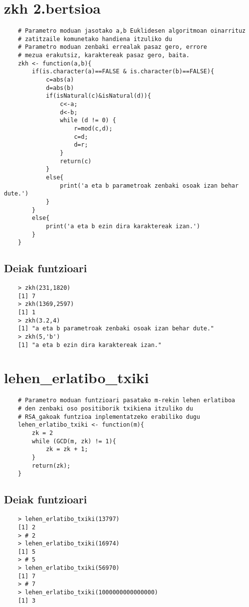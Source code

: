\documentclass[12pt]{basque-book}
\begin{document}
\section{zkh 2.bertsioa}
\begin{verbatim}
    # Parametro moduan jasotako a,b Euklidesen algoritmoan oinarrituz
    # zatitzaile komunetako handiena itzuliko du
    # Parametro moduan zenbaki errealak pasaz gero, errore
    # mezua erakutsiz, karaktereak pasaz gero, baita.
    zkh <- function(a,b){ 
        if(is.character(a)==FALSE & is.character(b)==FALSE){
            c=abs(a)
            d=abs(b)
            if(isNatural(c)&isNatural(d)){
                c<-a;
                d<-b;
                while (d != 0) {
                    r=mod(c,d);
                    c=d;
                    d=r;
                }
                return(c)
            }
            else{
                print('a eta b parametroak zenbaki osoak izan behar dute.')
            }
        }
        else{  
            print('a eta b ezin dira karaktereak izan.')
        }
    }
\end{verbatim}

\newpage

\subsection{Deiak funtzioari}
\begin{verbatim}
    > zkh(231,1820)
    [1] 7
    > zkh(1369,2597)
    [1] 1
    > zkh(3.2,4)
    [1] "a eta b parametroak zenbaki osoak izan behar dute." 
    > zkh(5,'b')
    [1] "a eta b ezin dira karaktereak izan."
\end{verbatim}

\newpage
\section{lehen\_erlatibo\_txiki}
\begin{verbatim}
    # Parametro moduan funtzioari pasatako m-rekin lehen erlatiboa 
    # den zenbaki oso positiborik txikiena itzuliko du
    # RSA_gakoak funtzioa inplementatzeko erabiliko dugu
    lehen_erlatibo_txiki <- function(m){
        zk = 2
        while (GCD(m, zk) != 1){
            zk = zk + 1;
        }
        return(zk);
    }
\end{verbatim}

\subsection{Deiak funtzioari}
\begin{verbatim}
    > lehen_erlatibo_txiki(13797)
    [1] 2
    > # 2
    > lehen_erlatibo_txiki(16974)
    [1] 5
    > # 5
    > lehen_erlatibo_txiki(56970)
    [1] 7
    > # 7
    > lehen_erlatibo_txiki(1000000000000000)
    [1] 3
\end{verbatim}
    
\end{document}
